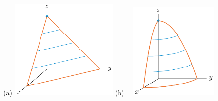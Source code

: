 \begin{answer}
\begin{center}
 (a) \raisebox{-0.5\height}
           {\includegraphics[width=0.4\textwidth, height=0.4\textwidth]
                                                   {fig/planeGraphB.pdf}}
\qquad
  (b)\ \ \raisebox{-0.45\height}
            {\includegraphics[width=0.33\textwidth, height=0.33\textwidth]
                                                   {fig/paraboloidGraphB.pdf}}
\end{center}
\end{answer}


